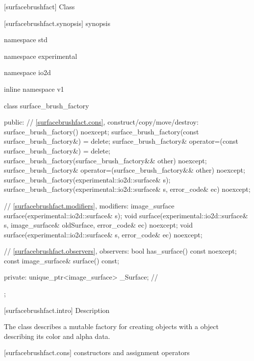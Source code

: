  [surfacebrushfact] {Class }

 [surfacebrushfact.synopsis] { synopsis}

\begin{codeblock}
namespace std { namespace experimental { namespace io2d { inline namespace v1 {
  class surface_brush_factory {
  public:
    // \ref{surfacebrushfact.cons}, construct/copy/move/destroy:
    surface_brush_factory() noexcept;
    surface_brush_factory(const surface_brush_factory&) = delete;
    surface_brush_factory& operator=(const surface_brush_factory&) = delete;
    surface_brush_factory(surface_brush_factory&& other) noexcept;
    surface_brush_factory& operator=(surface_brush_factory&& other) noexcept;
    surface_brush_factory(experimental::io2d::surface& s);
    surface_brush_factory(experimental::io2d::surface& s, error_code& ec) noexcept;
    
    // \ref{surfacebrushfact.modifiers}, modifiers:
    image_surface surface(experimental::io2d::surface& s);
    void surface(experimental::io2d::surface& s, image_surface& oldSurface, 
      error_code& ec) noexcept;
    void surface(experimental::io2d::surface& s, error_code& ec) noexcept;
    
    // \ref{surfacebrushfact.observers}, observers:
    bool has_surface() const noexcept;
    const image_surface& surface() const;
    
  private:
    unique_ptr<image_surface> _Surface; // \expos
  };
} } } }
\end{codeblock}

 [surfacebrushfact.intro] { Description}

\pnum
{}
The class  describes a mutable factory for creating  objects with a  object describing its color and alpha data.

 [surfacebrushfact.cons] { constructors and assignment operators}

